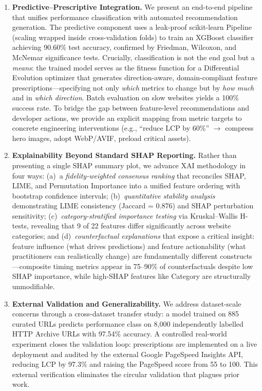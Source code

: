 \documentclass[sn-nature]{sn-jnl}
\begin{document}
\begin{enumerate}
    \item \textbf{Predictive--Prescriptive Integration.} We present an end-to-end pipeline that unifies performance classification with automated recommendation generation. The predictive component uses a leak-proof scikit-learn Pipeline (scaling wrapped inside cross-validation folds) to train an XGBoost classifier achieving 90.60\% test accuracy, confirmed by Friedman, Wilcoxon, and McNemar significance tests. Crucially, classification is not the end goal but a \textit{means}: the trained model serves as the fitness function for a Differential Evolution optimizer that generates direction-aware, domain-compliant feature prescriptions---specifying not only \textit{which} metrics to change but by \textit{how much} and in \textit{which direction}. Batch evaluation on slow websites yields a 100\% success rate. To bridge the gap between feature-level recommendations and developer actions, we provide an explicit mapping from metric targets to concrete engineering interventions (e.g., ``reduce LCP by 60\%'' $\rightarrow$ compress hero images, adopt WebP/AVIF, preload critical assets).

    \item \textbf{Explainability Beyond Standard SHAP Reporting.} Rather than presenting a single SHAP summary plot, we advance XAI methodology in four ways: (a)~a \textit{fidelity-weighted consensus ranking} that reconciles SHAP, LIME, and Permutation Importance into a unified feature ordering with bootstrap confidence intervals; (b)~\textit{quantitative stability analysis} demonstrating LIME consistency (Jaccard = 0.876) and SHAP perturbation sensitivity; (c)~\textit{category-stratified importance testing} via Kruskal--Wallis H-tests, revealing that 9 of 22 features differ significantly across website categories; and (d)~\textit{counterfactual explanations} that expose a critical insight: feature influence (what drives predictions) and feature actionability (what practitioners can realistically change) are fundamentally different constructs---composite timing metrics appear in 75--90\% of counterfactuals despite low SHAP importance, while high-SHAP features like Category are structurally unmodifiable.

    \item \textbf{External Validation and Generalizability.} We address dataset-scale concerns through a cross-dataset transfer study: a model trained on 885 curated URLs predicts performance class on 8,000 independently labelled HTTP Archive URLs with 97.54\% accuracy. A controlled real-world experiment closes the validation loop: prescriptions are implemented on a live deployment and audited by the external Google PageSpeed Insights API, reducing LCP by 97.3\% and raising the PageSpeed score from 55 to 100. This external verification eliminates the circular validation that plagues prior work.
\end{enumerate}
\end{document}

